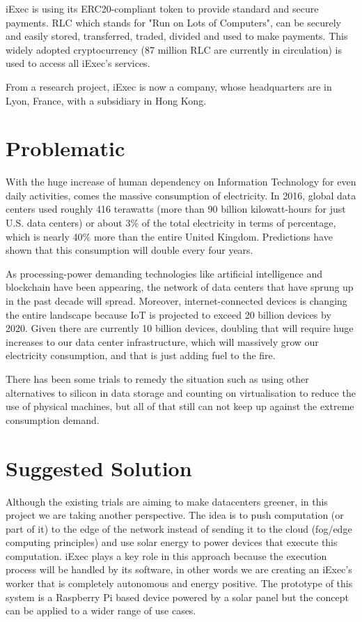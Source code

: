   iExec is using its ERC20-compliant token to provide standard and secure payments. RLC\cite{RLC} which stands for
  "Run on Lots of Computers", can be securely and easily stored, transferred, traded, divided and used
  to make payments. This widely adopted cryptocurrency (87 million RLC are currently in circulation)
  is used to access all iExec's services.

  From a research project, iExec is now a company, whose headquarters are in Lyon, France, with a
  subsidiary in Hong Kong.

\section{Problematic}
  With the huge increase of human dependency on Information Technology for even daily activities,
  comes the massive consumption of electricity. In 2016, global data centers used roughly 416
  terawatts (more than 90 billion kilowatt-hours for just U.S. data centers) or about 3\% of the
  total electricity in terms of percentage, which is nearly 40\% more than the entire United Kingdom.
  Predictions have shown that this consumption will double every four years\cite{consumption-prediction}.

  As processing-power demanding technologies like artificial intelligence and blockchain have
  been appearing, the network of data centers that have sprung up in the past decade will spread.
  Moreover, internet-connected devices is changing the entire landscape because IoT is
  projected to exceed 20 billion devices by 2020. Given there are currently 10 billion devices,
  doubling that will require huge increases to our data center infrastructure, which will
  massively grow our electricity consumption, and that is just adding fuel to the fire.

  There has been some trials to remedy the situation such as using other alternatives to silicon in
  data storage and counting on virtualisation to reduce the use of physical machines, but all of that
  still can not keep up against the extreme consumption demand.

\section{Suggested Solution}
  Although the existing trials are aiming to make datacenters greener, in this project we are taking another
  perspective. The idea is to push computation (or part of it) to the edge of the network instead of sending
  it to the cloud (fog/edge computing principles) and use solar energy to power devices that execute this
  computation. iExec plays a key role in this approach because the execution process will be handled by its
  software, in other words we are creating an iExec's worker that is completely autonomous and energy positive.
  The prototype of this system is a Raspberry Pi based device powered by a solar panel but the concept can be
  applied to a wider range of use cases.

